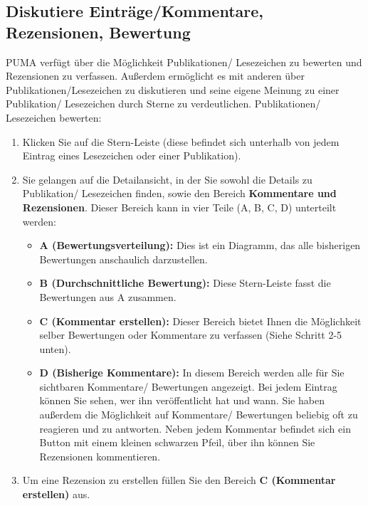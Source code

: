 \documentclass[a4paper,11pt,twoside]{scrbook}
\begin{document}
\subsection{Diskutiere Einträge/Kommentare, Rezensionen, Bewertung}
PUMA verfügt über die Möglichkeit Publikationen/ Lesezeichen zu bewerten und Rezensionen zu verfassen. Außerdem ermöglicht es mit anderen über Publikationen/Lesezeichen zu diskutieren und seine eigene Meinung zu einer Publikation/ Lesezeichen durch Sterne zu verdeutlichen.
\newline
\newline
Publikationen/ Lesezeichen bewerten:
\begin{enumerate}
    \item Klicken Sie auf die Stern-Leiste (diese befindet sich unterhalb von jedem Eintrag eines Lesezeichen oder einer Publikation).  
    \item Sie gelangen auf die Detailansicht, in der Sie sowohl die Details zu Publikation/ Lesezeichen finden, sowie den Bereich \textbf{Kommentare und Rezensionen}. Dieser Bereich kann in vier Teile (A, B, C, D) unterteilt werden:
    \begin{itemize} %
        \item \textbf{A (Bewertungsverteilung):} Dies ist ein Diagramm, das alle bisherigen Bewertungen anschaulich darzustellen. %
        \item \textbf{B (Durchschnittliche Bewertung):} Diese Stern-Leiste fasst die Bewertungen aus A zusammen.
        \item \textbf{C (Kommentar erstellen):} Dieser Bereich bietet Ihnen die Möglichkeit selber Bewertungen oder Kommentare zu verfassen (Siehe Schritt 2-5 unten).  %
        \item \textbf{D (Bisherige Kommentare):} In diesem Bereich werden alle für Sie sichtbaren Kommentare/ Bewertungen angezeigt. Bei jedem Eintrag können Sie sehen, wer ihn veröffentlicht hat und wann. Sie haben außerdem die Möglichkeit auf Kommentare/ Bewertungen beliebig oft zu reagieren und zu antworten. Neben jedem Kommentar befindet sich ein Button mit einem kleinen schwarzen Pfeil, über ihn können Sie Rezensionen kommentieren. 
    \end{itemize}
    \item Um eine Rezension zu erstellen füllen Sie den Bereich \textbf{C (Kommentar erstellen)} aus.
    \begin{enumerate}

\end{enumerate}
\end{enumerate}
\end{document}
